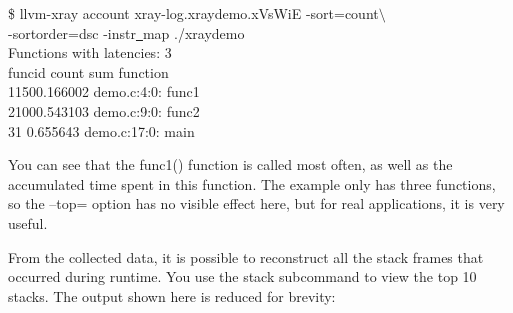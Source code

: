 \begin{tcolorbox}[colback=white,colframe=black]
\$ llvm-xray account xray-log.xraydemo.xVsWiE -sort=count$\setminus$ \\
\hspace*{0.5cm}-sortorder=dsc -instr\underline{~}map ./xraydemo \\
Functions with latencies: 3 \\
\hspace*{0.5cm}funcid \hspace{1cm}count \hspace{2cm}sum \hspace{1cm}function \\
\hspace*{1.4cm}1\hspace{1.4cm}150\hspace{1.4cm}0.166002 \hspace{1cm}demo.c:4:0: func1 \\
\hspace*{1.4cm}2\hspace{1.4cm}100\hspace{1.4cm}0.543103 \hspace{1cm}demo.c:9:0: func2 \\
\hspace*{1.4cm}3\hspace{1.8cm}1 \hspace{1.3cm}0.655643 \hspace{1cm}demo.c:17:0: main
\end{tcolorbox}

You can see that the func1() function is called most often, as well as the accumulated time spent in this function. The example only has three functions, so the –top= option has no visible effect here, but for real applications, it is very useful.\par

From the collected data, it is possible to reconstruct all the stack frames that occurred during runtime. You use the stack subcommand to view the top 10 stacks. The output shown here is reduced for brevity:\par

